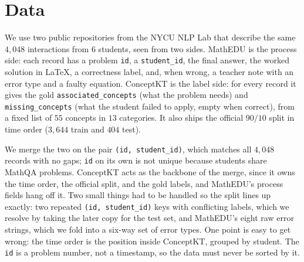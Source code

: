 \documentclass[11pt]{article}
\newcommand{\code}[1]{\texttt{\small #1}}
\begin{document}
\section{Data}
We use two public repositories from the NYCU NLP Lab that describe the same $4{,}048$
interactions from $6$ students, seen from two sides. MathEDU \cite{hsu2026mathedu} is
the process side: each record has a problem \code{id}, a \code{student\_id}, the final
answer, the worked solution in \LaTeX, a correctness label, and, when wrong, a teacher
note with an error type and a faulty equation. ConceptKT \cite{kang2026conceptkt} is
the label side: for every record it gives the gold \code{associated\_concepts} (what
the problem needs) and \code{missing\_concepts} (what the student failed to apply,
empty when correct), from a fixed list of $55$ concepts in $13$ categories. It also
ships the official $90/10$ split in time order ($3{,}644$ train and $404$ test).

We merge the two on the pair \code{(id, student\_id)}, which matches all
$4{,}048$ records with no gaps; \code{id} on its own is not unique because students
share MathQA problems. ConceptKT acts as the backbone of the merge, since it owns the
time order, the official split, and the gold labels, and MathEDU's process fields hang
off it. Two small things had to be handled so the split lines up exactly: two repeated
\code{(id, student\_id)} keys with conflicting labels, which we resolve by taking the later
copy for the test set, and MathEDU's eight raw error strings, which we fold into a
six-way set of error types. One point is easy to get wrong: the time order is the
position inside ConceptKT, grouped by student. The \code{id} is a problem number, not a
timestamp, so the data must never be sorted by it.
\end{document}

